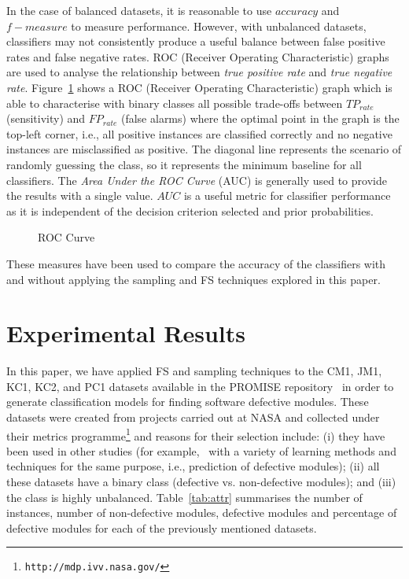 \documentclass{elsart}
\begin{document}
In the case of balanced datasets, it is reasonable to use $accuracy$ and  $f-measure$ to measure performance. However, with unbalanced datasets, classifiers may not consistently produce a useful balance between false positive rates and false negative rates. ROC (Receiver Operating Characteristic) graphs are used to analyse the relationship between \emph{true positive rate} and \emph{true negative rate}. Figure~\ref{fig:roc} shows a ROC (Receiver Operating Characteristic) graph which is able to characterise with binary classes all possible trade-offs between $TP_{rate}$(sensitivity) and $FP_{rate}$ (false alarms) where the optimal point in the graph is the top-left corner, i.e., all positive instances are classified correctly and no negative instances are misclassified as positive. The diagonal line represents the scenario of randomly guessing the class, so it represents the minimum baseline for all classifiers. The \emph{Area Under the ROC Curve} (AUC) is generally used to provide the results with a single value. $AUC$ is a useful metric for classifier performance as it is independent of the decision criterion selected and prior probabilities.

\begin{figure}%
  \centering
  \caption{ROC Curve}
  \label{fig:roc}%
\end{figure}


These measures have been used to compare the accuracy of the classifiers with and without applying the sampling and FS techniques
explored in this paper.



\section{Experimental Results}
\label{sec:experimentalResults}

In this paper, we have applied FS and sampling techniques to the CM1, JM1, KC1, KC2, and PC1 datasets available in the PROMISE
repository~\cite{PROMISERep} in order to generate classification models for finding software defective modules. These datasets were created from projects carried out at NASA and collected under their metrics programme\footnote{\texttt{http://mdp.ivv.nasa.gov/}} and reasons for their selection include: (i) they have been used in
other studies (for example,~\cite{Li+Reformat:2007,MenziesEtAl04,MenziesEtAl07} with a variety of learning methods and techniques for the same purpose, i.e., prediction of defective modules); (ii) all these datasets have a binary class (defective vs. non-defective modules); and (iii) the class is highly unbalanced. Table~\ref{tab:attr} summarises the number of instances, number of non-defective modules, defective modules and percentage of defective modules for each of the previously mentioned datasets.
\end{document}
